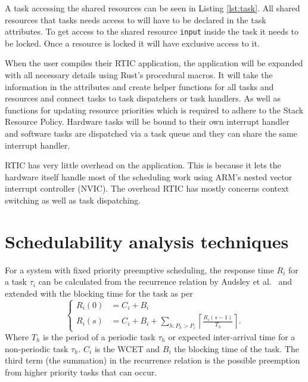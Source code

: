 A task accessing the shared resources can be seen in Listing \ref{lst:task}.
All shared resources that tasks needs access to will have to be declared in the
task attributes. To get access to the shared resource \texttt{input} inside the
task it needs to be locked. Once a resource is locked it will have exclusive
access to it.


When the user compiles their RTIC application, the application will be expanded
with all necessary details using Rust's procedural macros. It will take the
information in the attributes and create helper functions for all tasks and
resources and connect tasks to task dispatchers or task handlers. As well as
functions for updating resource priorities which is required to adhere to the
Stack Resource Policy. Hardware tasks will be bound to their own interrupt handler
and software tasks are dispatched via a task queue and they can share the same
interrupt handler.

RTIC has very little overhead on the application. This is because it lets the
hardware itself handle most of the scheduling work using ARM's nested vector
interrupt controller (NVIC). The overhead RTIC has mostly concerns context switching
as well as task dispatching.

\section{Schedulability analysis techniques}
\label{theory:schedulability}
For a system with fixed priority preemptive scheduling, the response time $R_i$
for a task $\tau_i$ can be calculated from the recurrence relation by Audsley
et al.\ \cite{audsley93} and extended with the blocking time for the task as
per\cite{hardrealtimecomputingsystems}
\begin{equation}
    \begin{cases}
        R_{i}(0) &= C_i + B_i \\
        R_{i}(s) &= C_i + B_i + \sum\limits_{h: P_h > P_i} \left\lceil \frac{R_{i}(s-1)}{T_h} \right\rceil.
    \end{cases}
\end{equation}
Where $T_h$ is the period of a periodic task $\tau_h$ or expected inter-arrival
time for a non-periodic task $\tau_h$. $C_i$ is the WCET and $B_i$ the blocking
time of the task. The third term (the summation) in the recurrence relation is
the possible preemption from higher priority tasks that can occur.

